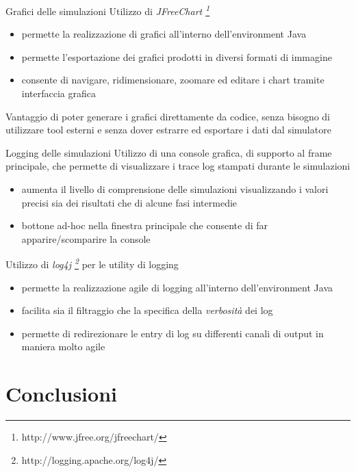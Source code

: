 \documentclass[slidestop,compress,mathserif]{beamer}
\begin{document}
\begin{frame}{Grafici delle simulazioni}
\vfill
Utilizzo di \emph{JFreeChart \footnote{http://www.jfree.org/jfreechart/}}
	\begin{itemize}
	\footnotesize
		\item[\textbullet] permette la realizzazione di grafici all'interno dell'environment Java
		\item[\textbullet] permette l'esportazione dei grafici prodotti in diversi formati di immagine 
		\item[\textbullet] consente di navigare, ridimensionare, zoomare ed editare i chart tramite interfaccia grafica
	\end{itemize}
\vfill
Vantaggio di poter generare i grafici direttamente da codice, senza bisogno di utilizzare tool esterni e senza dover estrarre ed esportare i dati dal simulatore
\end{frame}

\begin{frame}{Logging delle simulazioni}
\vfill
Utilizzo di una console grafica, di supporto al frame principale, che permette di visualizzare i trace log stampati durante le simulazioni
	\begin{itemize}
		\footnotesize
		\item[\textbullet] aumenta il livello di comprensione delle simulazioni visualizzando i valori precisi sia dei risultati che di alcune fasi intermedie
		\item[\textbullet] bottone ad-hoc nella finestra principale che consente di far apparire/scomparire la console
	\end{itemize}
\vfill
Utilizzo di \emph{log4j \footnote{http://logging.apache.org/log4j/}} per le utility di logging
	\begin{itemize}
	\footnotesize
		\item[\textbullet] permette la realizzazione agile di logging all'interno dell'environment Java
		\item[\textbullet] facilita sia il filtraggio che la specifica della \emph{verbosit\`a} dei log
		\item[\textbullet] permette di redirezionare le entry di log su differenti canali di output in maniera molto agile
	\end{itemize}
\end{frame}

\section{Conclusioni}
\end{document}
